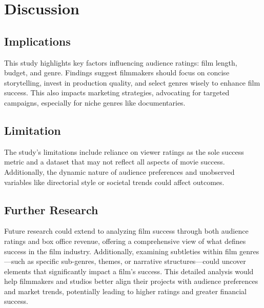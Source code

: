 \documentclass[
  11pt,
]{article}
\begin{document}
\hypertarget{discussion}{%
\section{Discussion}\label{discussion}}

\hypertarget{implications}{%
\subsection{Implications}\label{implications}}

This study highlights key factors influencing audience ratings: film
length, budget, and genre. Findings suggest filmmakers should focus on
concise storytelling, invest in production quality, and select genres
wisely to enhance film success. This also impacts marketing strategies,
advocating for targeted campaigns, especially for niche genres like
documentaries.

\hypertarget{limitation}{%
\subsection{Limitation}\label{limitation}}

The study's limitations include reliance on viewer ratings as the sole
success metric and a dataset that may not reflect all aspects of movie
success. Additionally, the dynamic nature of audience preferences and
unobserved variables like directorial style or societal trends could
affect outcomes.

\hypertarget{further-research}{%
\subsection{Further Research}\label{further-research}}

Future research could extend to analyzing film success through both
audience ratings and box office revenue, offering a comprehensive view
of what defines success in the film industry. Additionally, examining
subtleties within film genres---such as specific sub-genres, themes, or
narrative structures---could uncover elements that significantly impact
a film's success. This detailed analysis would help filmmakers and
studios better align their projects with audience preferences and market
trends, potentially leading to higher ratings and greater financial
success.
\end{document}
